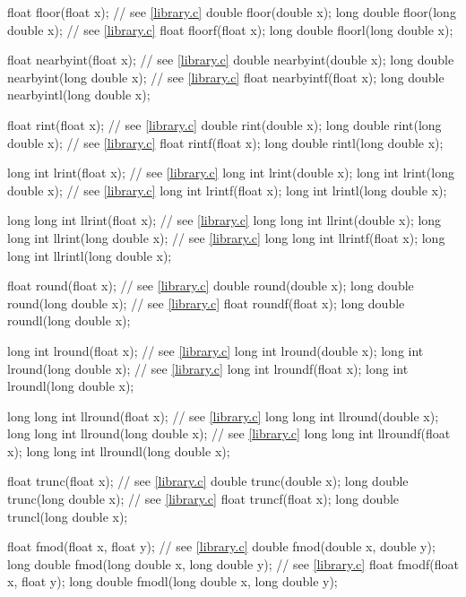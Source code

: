 \begin{codeblock}
{  float floor(float x);                 // see \ref{library.c}
  double floor(double x);
  long double floor(long double x);     // see \ref{library.c}
  float floorf(float x);
  long double floorl(long double x);

  float nearbyint(float x);             // see \ref{library.c}
  double nearbyint(double x);
  long double nearbyint(long double x); // see \ref{library.c}
  float nearbyintf(float x);
  long double nearbyintl(long double x);

  float rint(float x);                  // see \ref{library.c}
  double rint(double x);
  long double rint(long double x);      // see \ref{library.c}
  float rintf(float x);
  long double rintl(long double x);

  long int lrint(float x);              // see \ref{library.c}
  long int lrint(double x);
  long int lrint(long double x);        // see \ref{library.c}
  long int lrintf(float x);
  long int lrintl(long double x);

  long long int llrint(float x);        // see \ref{library.c}
  long long int llrint(double x);
  long long int llrint(long double x);  // see \ref{library.c}
  long long int llrintf(float x);
  long long int llrintl(long double x);

  float round(float x);                 // see \ref{library.c}
  double round(double x);
  long double round(long double x);     // see \ref{library.c}
  float roundf(float x);
  long double roundl(long double x);

  long int lround(float x);             // see \ref{library.c}
  long int lround(double x);
  long int lround(long double x);       // see \ref{library.c}
  long int lroundf(float x);
  long int lroundl(long double x);

  long long int llround(float x);       // see \ref{library.c}
  long long int llround(double x);
  long long int llround(long double x); // see \ref{library.c}
  long long int llroundf(float x);
  long long int llroundl(long double x);

  float trunc(float x);                 // see \ref{library.c}
  double trunc(double x);
  long double trunc(long double x);     // see \ref{library.c}
  float truncf(float x);
  long double truncl(long double x);

  float fmod(float x, float y);         // see \ref{library.c}
  double fmod(double x, double y);
  long double fmod(long double x, long double y);   // see \ref{library.c}
  float fmodf(float x, float y);
  long double fmodl(long double x, long double y);

}
\end{codeblock}
